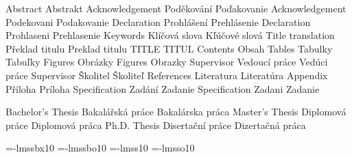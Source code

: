      {Abstract}          {Abstrakt}       {}
       {Acknowledgement}   {Poděkování}     {Poďakovanie} 
      {Acknowledgement}   {Podekovani}     {Podakovanie} 
  {Declaration}       {Prohlášení}     {Prehlásenie} 
 {Declaration}       {Prohlaseni}     {Prehlasenie}
     {Keywords}          {Klíčová slova}  {Kľúčové slová}
        {Title translation} {Překlad titulu} {Preklad titulu}
       {TITLE}             {TITUL}          {}
     {Contents}          {Obsah}          {}
       {Tables}            {Tabulky}        {Tabuľky}
      {Figures}           {Obrázky}        {}
     {Figures}           {Obrazky}        {}
   {Supervisor}        {Vedoucí práce}  {Vedúci práce}
  {Supervisor}        {Školitel}       {Školiteľ}
 {References}        {Literatura}     {Literatúra}
     {Appendix}          {Příloha}        {Príloha}     
      {Specification}     {Zadání}         {Zadanie}
     {Specification}     {Zadani}         {Zadanie}

 {Bachelor's Thesis} {Bakalářská práce}  {Bakalárska práca}
 {Master's Thesis}   {Diplomová práce}   {Diplomová práca}
 {Ph.D. Thesis}      {Disertační práce}  {Dizertačná práca}

\def\keepacc#1{\slet{mt:#10:sk}{mt:#1:sk}\slet{mt:#10:\czs}{mt:#1:\czs}}
\def\keepaccents{\keepacc{thanks}%
  \keepacc{declaration}\keepacc{figures}\keepacc{specifi}}



\def\worktype[#1/#2]{%
   \isdefined{wt:#1}\iftrue \csname wt:#1\endcsname \relax
      \else \ctustyleERR {Unknown \noexpand\worktype parameter}\fi
   \isdefined{wl:#2}\iftrue \csname wl:#2\endcsname \relax
      \else \ctustyleERR {Unknown \noexpand\worktype parameter}\fi
}




\ifx\font\corkencoded {}\else{}\fi

\let\serifbf=\tenbf \let\serifbi=\tenbi
\font\tenbf=\tmp-lmssbx10 
\font\tenbi=\tmp-lmssbo10
\font\tenss=\tmp-lmss10
\font\tenssi=\tmp-lmsso10
\regfont\tenss \regfont\tenssi
\def\ssr{\tenss} \def\ssi{\tenssi} \def\sc{\tenrmc}
\def\textit#1{{\em#1}} \def\textsc#1{{\sc#1}}

